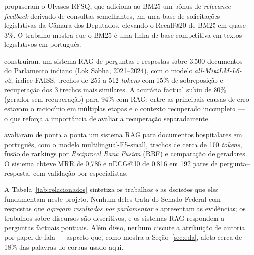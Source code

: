 \documentclass[12pt]{article}
\begin{document}
\cite{vitorio2022} propuseram o Ulysses-RFSQ, que adiciona ao BM25 um bônus de
\textit{relevance feedback} derivado de consultas semelhantes, em uma base de solicitações
legislativas da Câmara dos Deputados, elevando o Recall@20 do BM25 em quase 3\%. O trabalho mostra
que o BM25 é uma linha de base competitiva em textos legislativos em português.

\cite{sivakumar2026} construíram um sistema RAG de perguntas e respostas sobre 3.500 documentos
do Parlamento indiano (Lok Sabha, 2021--2024), com o modelo \textit{all-MiniLM-L6-v2}, índice FAISS,
trechos de 256 a 512 \textit{tokens} com 15\% de sobreposição e recuperação dos 3 trechos mais
similares. A acurácia factual subiu de 80\% (gerador sem recuperação) para 94\% com RAG; entre as
principais causas de erro estavam o raciocínio em múltiplas etapas e o contexto recuperado
incompleto --- o que reforça a importância de avaliar a recuperação separadamente.

\cite{cunha2026} avaliaram de ponta a ponta um sistema RAG para documentos hospitalares em
português, com o modelo multilingual-E5-small, trechos de cerca de 100 \textit{tokens}, fusão de
rankings por \textit{Reciprocal Rank Fusion} (RRF) e comparação de geradores. O sistema obteve MRR
de 0,786 e nDCG@10 de 0,816 em 192 pares de pergunta--resposta, com validação por especialistas.

A Tabela~\ref{tab:relacionados} sintetiza os trabalhos e as decisões que eles fundamentam neste
projeto. Nenhum deles trata do Senado Federal com respostas que \emph{agregam resultados por
parlamentar} e apresentam as evidências; os trabalhos sobre discursos são descritivos, e os
sistemas RAG respondem a perguntas factuais pontuais. Além disso, nenhum discute a atribuição de
autoria por papel de fala --- aspecto que, como mostra a Seção~\ref{sec:eda}, afeta cerca de 18\%
das palavras do corpus usado aqui.
\end{document}
